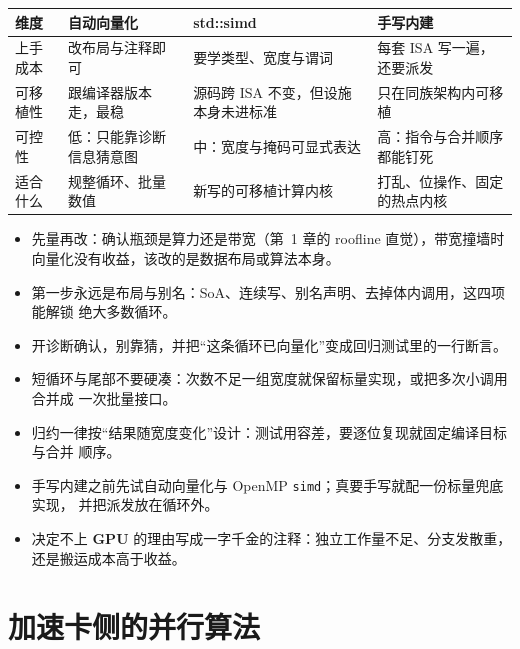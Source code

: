 \documentclass[12pt,a4paper,fontset=fandol]{ctexbook}
\newcommand{\Tp}[1]{\texttt{#1}}
\newcommand{\Dom}[1]{\textsf{\bfseries #1}}
\newcommand{\GPU}{\Dom{GPU}}
\begin{document}
\begin{compare}[title={三条向量化路线的取舍}]
\begin{tabular}{@{}>{\raggedright\arraybackslash}p{}
  >{\raggedright\arraybackslash}p{}
  >{\raggedright\arraybackslash}p{}
  >{\raggedright\arraybackslash}p{}@{}}
\toprule
维度 & 自动向量化 & std::simd & 手写内建 \\
\midrule
上手成本 & 改布局与注释即可 & 要学类型、宽度与谓词 & 每套 ISA 写一遍，还要派发 \\
可移植性 & 跟编译器版本走，最稳 & 源码跨 ISA 不变，但设施本身未进标准 & 只在同族架构内可移植 \\
可控性 & 低：只能靠诊断信息猜意图 & 中：宽度与掩码可显式表达 & 高：指令与合并顺序都能钉死 \\
适合什么 & 规整循环、批量数值 & 新写的可移植计算内核 & 打乱、位操作、固定的热点内核 \\
\bottomrule
\end{tabular}
\end{compare}

\begin{guideline}[title={向量化的决策顺序}]
\begin{itemize}
  \item 先量再改：确认瓶颈是算力还是带宽（第~1 章的 roofline 直觉），带宽撞墙时
        向量化没有收益，该改的是数据布局或算法本身。
  \item 第一步永远是布局与别名：SoA、连续写、别名声明、去掉体内调用，这四项能解锁
        绝大多数循环。
  \item 开诊断确认，别靠猜，并把``这条循环已向量化''变成回归测试里的一行断言。
  \item 短循环与尾部不要硬凑：次数不足一组宽度就保留标量实现，或把多次小调用合并成
        一次批量接口。
  \item 归约一律按``结果随宽度变化''设计：测试用容差，要逐位复现就固定编译目标与合并
        顺序。
  \item 手写内建之前先试自动向量化与 OpenMP \Tp{simd}；真要手写就配一份标量兜底实现，
        并把派发放在循环外。
  \item 决定不上 \GPU{} 的理由写成一字千金的注释：独立工作量不足、分支发散重，
        还是搬运成本高于收益。
\end{itemize}
\end{guideline}
\part{加速卡侧的并行算法}
\end{document}
